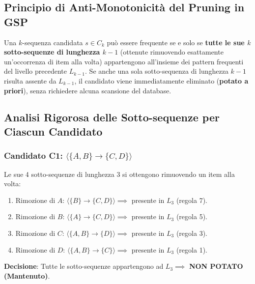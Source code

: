 \FloatBarrier
\subsection{Principio di Anti-Monotonicità del Pruning in GSP}
\begin{theorem}
\label{thm:dm-gsp-pruning}
Una $k$-sequenza candidata $s \in C_k$ può essere frequente se e solo se \textbf{tutte le sue $k$ sotto-sequenze di lunghezza $k-1$} (ottenute rimuovendo esattamente un'occorrenza di item alla volta) appartengono all'insieme dei pattern frequenti del livello precedente $L_{k-1}$. Se anche una sola sotto-sequenza di lunghezza $k-1$ risulta assente da $L_{k-1}$, il candidato viene immediatamente eliminato (\textbf{potato a priori}), senza richiedere alcuna scansione del database.
\end{theorem}

\FloatBarrier
\subsection{Analisi Rigorosa delle Sotto-sequenze per Ciascun Candidato}

\subsubsection{Candidato C1: \texorpdfstring{$\langle \{A, B\} \to \{C, D\} \rangle$}{C1}}
Le sue 4 sotto-sequenze di lunghezza 3 si ottengono rimuovendo un item alla volta:
\begin{enumerate}
    \item Rimozione di $A$: $\langle \{B\} \to \{C, D\} \rangle \implies$ presente in $L_3$ (regola 7).
    \item Rimozione di $B$: $\langle \{A\} \to \{C, D\} \rangle \implies$ presente in $L_3$ (regola 5).
    \item Rimozione di $C$: $\langle \{A, B\} \to \{D\} \rangle \implies$ presente in $L_3$ (regola 3).
    \item Rimozione di $D$: $\langle \{A, B\} \to \{C\} \rangle \implies$ presente in $L_3$ (regola 1).
\end{enumerate}
\textbf{Decisione}: Tutte le sotto-sequenze appartengono ad $L_3 \implies$ \textbf{NON POTATO (Mantenuto)}.

